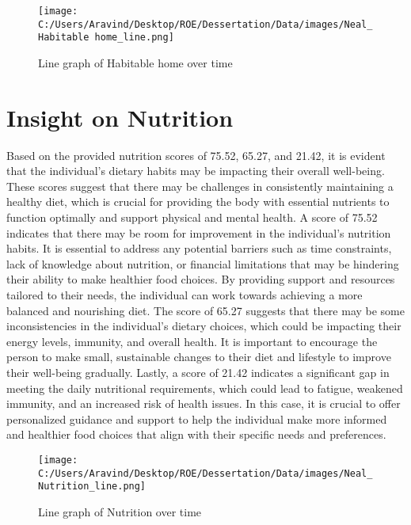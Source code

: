\documentclass[10pt, a4paper]{article}%
\begin{document}
\begin{figure}[H]%
\centering%
\texttt{[image: C:/Users/Aravind/Desktop/ROE/Dessertation/Data/images/Neal\_Habitable home\_line.png]}%
\caption{Line graph of Habitable home over time}%
\end{figure}

%
\section{Insight on Nutrition}%
\label{sec:InsightonNutrition}%
Based on the provided nutrition scores of 75.52, 65.27, and 21.42, it is evident that the individual's dietary habits may be impacting their overall well{-}being. These scores suggest that there may be challenges in consistently maintaining a healthy diet, which is crucial for providing the body with essential nutrients to function optimally and support physical and mental health.\newline%
\newline%
A score of 75.52 indicates that there may be room for improvement in the individual's nutrition habits. It is essential to address any potential barriers such as time constraints, lack of knowledge about nutrition, or financial limitations that may be hindering their ability to make healthier food choices. By providing support and resources tailored to their needs, the individual can work towards achieving a more balanced and nourishing diet.\newline%
\newline%
The score of 65.27 suggests that there may be some inconsistencies in the individual's dietary choices, which could be impacting their energy levels, immunity, and overall health. It is important to encourage the person to make small, sustainable changes to their diet and lifestyle to improve their well{-}being gradually.\newline%
\newline%
Lastly, a score of 21.42 indicates a significant gap in meeting the daily nutritional requirements, which could lead to fatigue, weakened immunity, and an increased risk of health issues. In this case, it is crucial to offer personalized guidance and support to help the individual make more informed and healthier food choices that align with their specific needs and preferences.%


\begin{figure}[H]%
\centering%
\texttt{[image: C:/Users/Aravind/Desktop/ROE/Dessertation/Data/images/Neal\_Nutrition\_line.png]}%
\caption{Line graph of Nutrition over time}%
\end{figure}
\end{document}
